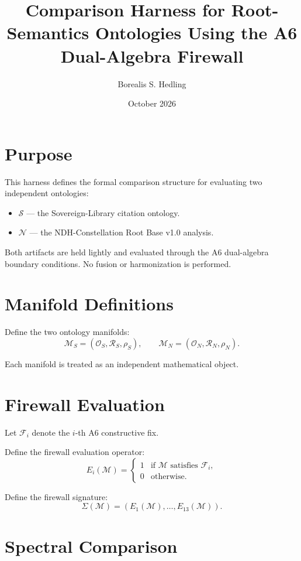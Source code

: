 \documentclass[11pt]{article}
\title{Comparison Harness for Root-Semantics Ontologies Using the A6 Dual-Algebra Firewall}
\author{Borealis S. Hedling}
\date{October 2026}
\begin{document}
\maketitle

\section*{Purpose}

This harness defines the formal comparison structure for evaluating two
independent ontologies:

\begin{itemize}
  \item $\mathcal{S}$ — the Sovereign-Library citation ontology.
  \item $\mathcal{N}$ — the NDH-Constellation Root Base v1.0 analysis.
\end{itemize}

Both artifacts are held lightly and evaluated through the A6 dual-algebra
boundary conditions. No fusion or harmonization is performed.

\section{Manifold Definitions}

Define the two ontology manifolds:
\[
\mathcal{M}_S = (\mathcal{O}_S, \mathcal{R}_S, \rho_S),
\qquad
\mathcal{M}_N = (\mathcal{O}_N, \mathcal{R}_N, \rho_N).
\]

Each manifold is treated as an independent mathematical object.

\section{Firewall Evaluation}

Let $\mathcal{F}_i$ denote the $i$-th A6 constructive fix.

Define the firewall evaluation operator:
\[
E_i(\mathcal{M}) =
\begin{cases}
1 & \text{if } \mathcal{M} \text{ satisfies } \mathcal{F}_i, \\
0 & \text{otherwise}.
\end{cases}
\]

Define the firewall signature:
\[
\Sigma(\mathcal{M}) = (E_1(\mathcal{M}), \ldots, E_{13}(\mathcal{M})).
\]

\section{Spectral Comparison}
\end{document}
